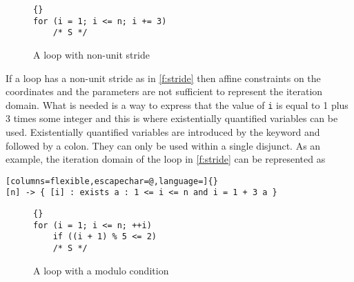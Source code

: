 \begin{figure}
\begin{lstlisting}[escapechar=@]{}
for (i = 1; i <= n; i += 3)
    /* S */
\end{lstlisting}
\caption{A loop with non-unit stride}
\label{f:stride}
\end{figure}

If a loop has a non-unit stride as in \autoref{f:stride}
then affine constraints on the coordinates and the parameters
are not sufficient to represent the iteration domain.
What is needed is a way to express that the value of
\lstinline{i} is equal to 1 plus 3 times some integer and
this is where existentially quantified variables can be used.
Existentially quantified variables are introduced by the
 keyword and followed by a colon.
They can only be used within a single disjunct.
As an example, the iteration domain of the loop in \autoref{f:stride}
can be represented as
\begin{lstlisting}[columns=flexible,escapechar=@,language=]{}
[n] -> { [i] : exists a : 1 <= i <= n and i = 1 + 3 a }
\end{lstlisting}

\begin{figure}
\begin{lstlisting}[escapechar=@]{}
for (i = 1; i <= n; ++i)
    if ((i + 1) % 5 <= 2)
	/* S */
\end{lstlisting}
\caption{A loop with a modulo condition}
\label{f:modulo}
\end{figure}

